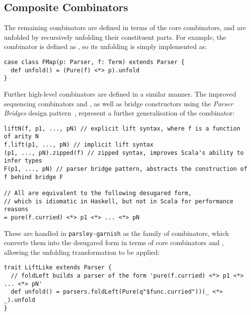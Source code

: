 \documentclass[../../main.tex]{subfiles}
\begin{document}
\subsection{Composite Combinators}
The remaining combinators are defined in terms of the core combinators, and are unfolded by recursively unfolding their constituent parts.
For example, the  combinator is defined as , so its unfolding is simply implemented as:
\begin{verbatim}
case class FMap(p: Parser, f: Term) extends Parser {
  def unfold() = (Pure(f) <*> p).unfold
}
\end{verbatim}
%
Further high-level combinators are defined in a similar manner.
The improved sequencing combinators  and , as well as bridge constructors using the \emph{Parser Bridges} design pattern~\cite{willis_design_2022}, represent a further generalisation of the  combinator:
\begin{verbatim}
liftN(f, p1, ..., pN) // explicit lift syntax, where f is a function of arity N
f.lift(p1, ..., pN) // implicit lift syntax
(p1, ..., pN).zipped(f) // zipped syntax, improves Scala's ability to infer types
F(p1, ..., pN) // parser bridge pattern, abstracts the construction of f behind bridge F

// All are equivalent to the following desugared form,
// which is idiomatic in Haskell, but not in Scala for performance reasons
= pure(f.curried) <*> p1 <*> ... <*> pN
\end{verbatim}
%
These are handled in \texttt{parsley-garnish} as the  family of combinators, which converts them into the desugared form in terms of core combinators  and \scala{<*>}, allowing the unfolding transformation to be applied:
\begin{verbatim}
trait LiftLike extends Parser {
  // foldLeft builds a parser of the form 'pure(f.curried) <*> p1 <*> ... <*> pN'
  def unfold() = parsers.foldLeft(Pure(q"$func.curried"))(_ <*> _).unfold
}
\end{verbatim}
\end{document}
